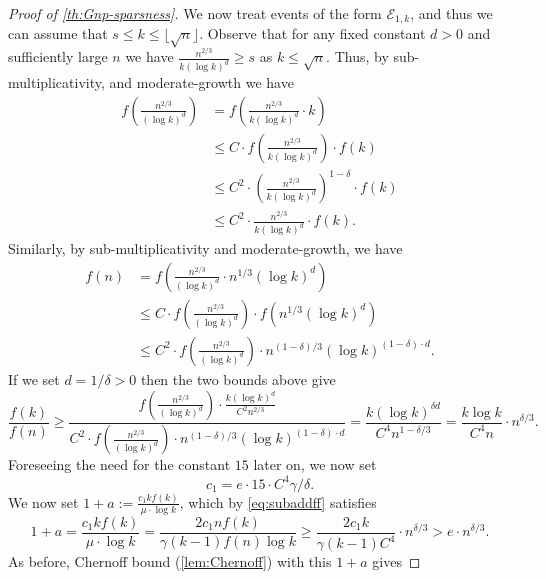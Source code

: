\documentclass[letterpaper,11pt]{article}
\newcommand{\Slin}{moderate-growth\xspace}
\newcommand{\Smul}{sub-multiplicativity\xspace}
\theoremstyle{definition}
\theoremstyle{remark}
\renewcommand{\leq}{\leqslant}
\renewcommand{\geq}{\geqslant}
\begin{document}
\begin{proof}[Proof of \cref{th:Gnp-sparsness}]
We now treat events of the form $\mathcal{E}_{1,k}$, and thus we can assume that $s\leq k\leq \lfloor \sqrt{n} \rfloor $. 
Observe that for any fixed constant $d>0$ and sufficiently  large $n$ we have $\frac{n^{2/3}}{ k(\log k)^d} \geq s $  as $k\leq \sqrt{n}$.  Thus, by \Smul,  and \Slin we have
\begin{align*}f\left( \frac{n^{2/3}}{(\log k)^d} \right) &= f\left(  \frac{n^{2/3}}{ k(\log k)^d}   \cdot k \right)\\
	& \leq C\cdot  f\left(  \frac{n^{2/3}}{ k(\log k)^d} \right) \cdot f\left( k \right) \\
	 &\leq C^2\cdot    \left(\frac{n^{2/3}}{ k(\log k)^d}\right)^{1-\delta} \cdot f(k)\\
	 & \leq C^2\cdot  \frac{n^{2/3}}{ k(\log k)^d} \cdot f(k). \end{align*}
Similarly, by \Smul and \Slin, we have
\begin{align*}f(n)  &=  f\left(  \frac{n^{2/3}}{(\log k)^d}  \cdot n^{1/3}(\log k)^d  \right)\\ 
	&\leq C\cdot  f\left(  \frac{n^{2/3}}{(\log k)^d} \right) \cdot f\left(n^{1/3}(\log k)^d  \right) \\
	&\leq C^2\cdot  f\left(  \frac{n^{2/3}}{(\log k)^d}  \right)\cdot n^{(1-\delta)/3}(\log k)^{(1-\delta)\cdot d}.\end{align*} If we set $d = 1/\delta >0$ then the two bounds above give  
\begin{equation}\label{eq:subaddff}
	\frac{f(k)}{ f(n)}  
	\geq \frac{f\left(  \frac{n^{2/3}}{(\log k)^d}  \right) \cdot \frac{k (\log k)^d }{C^2n^{2/3}}}{C^2\cdot f\left(  \frac{n^{2/3}}{(\log k)^d}  \right)\cdot n^{(1-\delta)/3}(\log k)^{(1-\delta)\cdot d} } = \frac{k (\log k)^{\delta d} }{C^4n^{1-\delta/3}} 
	= \frac{k \log k }{C^4n}\cdot n^{\delta/3} 
	.\end{equation} Foreseeing the need for the constant $15$ later on, we now set \begin{equation}\label{eq:constc1} c_1  =e\cdot 15 \cdot C^4 \gamma/\delta .\end{equation} We now set $1+a:= \frac{c_1 k f(k)}{\mu\cdot \log k}$, which by \eqref{eq:subaddff}  satisfies
	\begin{equation}\label{eq:secondabdd}1+a= \frac{c_1 k f(k)}{\mu\cdot \log k} = \frac{2c_1nf(k)}{\gamma(k-1)f(n)\log k }\geq \frac{2c_1k }{\gamma (k-1) C^4 }\cdot n^{\delta/3}  > e\cdot n^{\delta/3} . \end{equation}   As before, Chernoff bound (\cref{lem:Chernoff}) with this $1+a$ gives 

\end{proof}
\end{document}
